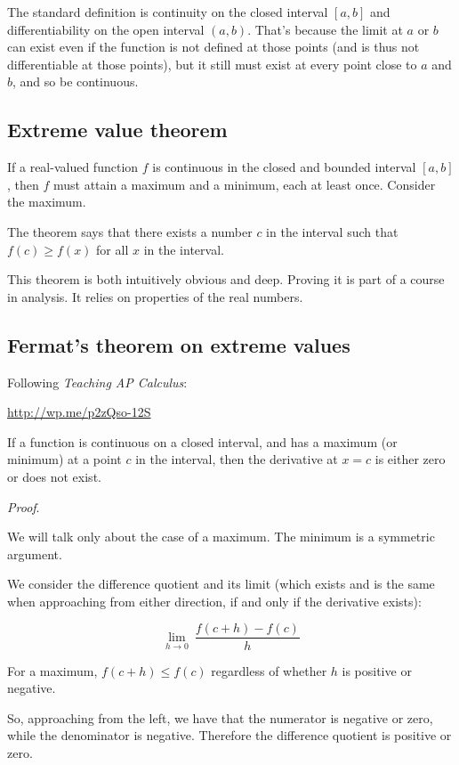 \documentclass[11pt, oneside]{article}
\begin{document}
The standard definition is continuity on the closed interval $[a,b]$ and differentiability on the open interval $(a,b)$.  That's because the limit at $a$ or $b$ can exist even if the function is not defined at those points (and is thus not differentiable at those points), but it still must exist at every point close to $a$ and $b$, and so be continuous.

\subsection*{Extreme value theorem}

If a real-valued function $f$ is continuous in the closed and bounded interval $[a,b]$, then $f$ must attain a maximum and a minimum, each at least once.  Consider the maximum.

The theorem says that there exists a number $c$ in the interval such that $f(c) \ge f(x)$ for all $x$ in the interval.

This theorem is both intuitively obvious and deep.  Proving it is part of a course in analysis.  It relies on properties of the real numbers.

\subsection*{Fermat's theorem on extreme values}

Following \emph{Teaching AP Calculus}:

\url{http://wp.me/p2zQso-12S}

If a function is continuous on a closed interval, and has a maximum (or minimum) at a point $c$ in the interval, then the derivative at $x = c$ is either zero or does not exist.  

\emph{Proof}.

We will talk only about the case of a maximum.  The minimum is a symmetric argument.

We consider the difference quotient and its limit (which exists and is the same when approaching from either direction, if and only if the derivative exists):

\[ \lim_{h \rightarrow 0} \ \frac{f(c + h) - f(c)}{h} \]

For a maximum, $f(c + h) \le f(c)$ regardless of whether $h$ is positive or negative.

So, approaching from the left, we have that the numerator is negative or zero, while the denominator is negative.  Therefore the difference quotient is positive or zero.
\end{document}
